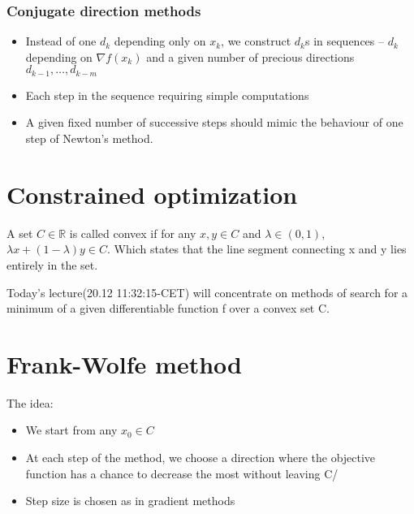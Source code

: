\subsubsection{Conjugate direction methods}
\begin{itemize}
    \item Instead of one $d_k$ depending only on  $x_k$, we construct  $d_k$s in sequences --  $d_k$ depending on  $\nabla f(x_k)$ and a given number of precious directions  $d_{k-1}, \dots, d_{k-m}$
    \item Each step in the sequence requiring simple computations
    \item A given fixed number of successive steps should mimic the behaviour of one step of Newton's method.

        
\end{itemize}



\section{Constrained optimization}

{
    A set  $C\in \mathbb{R}$ is called convex if for any $x,y \in C$ and  $\lambda \in (0,1)$,  $\lambda x +(1-\lambda)y \in C$.
    Which states that the line segment connecting x and y lies entirely in the set.

    \nt
    {
        Today's lecture(20.12	11:32:15-CET) will concentrate on methods of search for a minimum of a given differentiable function f over a convex set C.
    }
}


\section{Frank-Wolfe method}

The idea:
\begin{itemize}
        \item We start from any $x_0 \in C$
        \item At each step of the method, we choose a direction where the objective function has a chance to decrease the most without leaving C/
        \item Step size is chosen as in gradient methods
        
\end{itemize}
